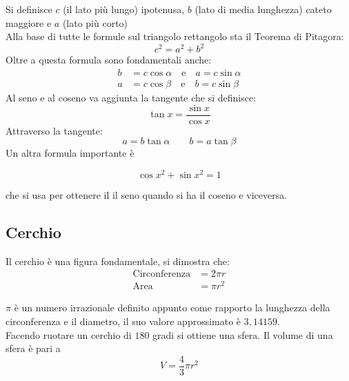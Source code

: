 \begin{center}     
\end{center}
Si definisce $c$ (il lato più lungo) ipotenusa, $b$ (lato di media lunghezza) cateto maggiore e
$a$ (lato più corto)\\
Alla base di tutte le formule sul triangolo rettangolo sta il Teorema di Pitagora:
\begin{equation*}
  c^2=a^2+b^2
\end{equation*}
Oltre a questa formula sono fondamentali anche:
\begin{align*}
  b&=c\cos\alpha\quad\text{e}\quad a=c\sin\alpha\\
  a&=c\cos\beta\quad\text{e}\quad b=c\sin\beta
\end{align*}
Al seno e al coseno va aggiunta la tangente che si definisce:
\begin{equation*}
  \tan x = \frac{\sin x}{\cos x}
\end{equation*}
Attraverso la tangente:
\begin{equation*}
  a=b\tan\alpha \qquad
  b=a \tan\beta
\end{equation*}  
Un altra formula importante è
\vspace{-0.5cm}
\begin{center}
  \begin{equation*}
    \cos{x}^{2}+\sin{x}^{2}=1 
  \end{equation*}
\end{center}
che si usa per ottenere il il seno quando si ha il coseno e viceversa.
\subsection{Cerchio}

Il cerchio è una figura fondamentale, si dimostra che: 
\begin{align*}
  \text{Circonferenza}&=2\pi r\\
  \text{Area}&=\pi r^2
\end{align*}

\begin{center}     
\end{center}
$\pi$ è un numero irrazionale definito appunto come rapporto la lunghezza della circonferenza e il 
diametro, il suo valore approssimato è $3,14159$. \\	
Facendo ruotare un cerchio di $180$ gradi si ottiene una sfera. Il volume di una sfera è pari a
\begin{equation*}
  V=\frac{4}{3}\pi r^{2}
\end{equation*}

